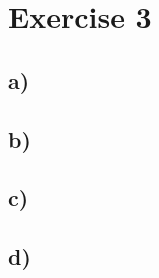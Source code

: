 \documentclass[fleqn,12pt]{article}
\begin{document}
\section*{Exercise 3}
\subsection*{a)}

\subsection*{b)}

\subsection*{c)}

\subsection*{d)}
\end{document}
